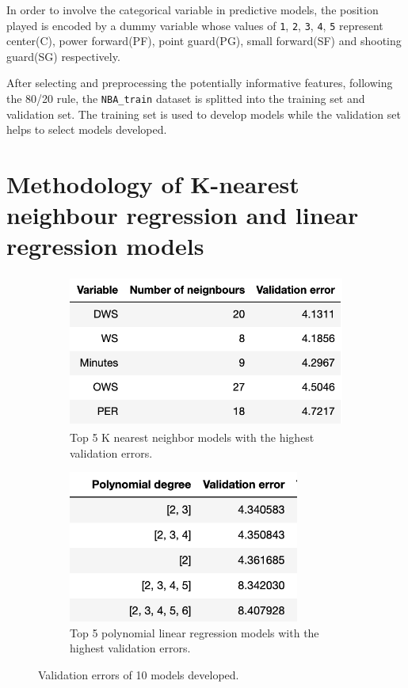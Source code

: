 \documentclass[letterpaper,12pt,twoside,]{pinp}
\begin{document}
In order to involve the categorical variable in predictive models, the
position played is encoded by a dummy variable whose values of
\texttt{1}, \texttt{2}, \texttt{3}, \texttt{4}, \texttt{5} represent
center(C), power forward(PF), point guard(PG), small forward(SF) and
shooting guard(SG) respectively.

After selecting and preprocessing the potentially informative features,
following the 80/20 rule, the \texttt{NBA\_train} dataset is splitted
into the training set and validation set. The training set is used to
develop models while the validation set helps to select models
developed.

\hypertarget{methodology-of-k-nearest-neighbour-regression-and-linear-regression-models}{%
\section{Methodology of K-nearest neighbour regression and linear
regression
models}\label{methodology-of-k-nearest-neighbour-regression-and-linear-regression-models}}

\begin{figure}[H]
\begin{subfigure}{0.5\textwidth}
\includegraphics[width=0.9\linewidth, height=5cm]{knn_models.png} 
\caption{Top 5 K nearest neighbor models with the highest validation errors.}
\label{fig:subim1}
\end{subfigure}
\begin{subfigure}{0.5\textwidth}
\includegraphics[width=0.9\linewidth, height=5cm]{poly_models.png}
\caption{Top 5 polynomial linear regression models with the highest validation errors.}
\label{fig:subim2}
\end{subfigure}
\caption{Validation errors of 10 models developed.}
\end{figure}
\end{document}
